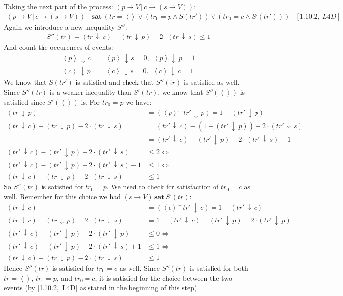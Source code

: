 \documentclass[11pt,a4paper]{article}
\def\ra{\rightarrow}
\def\ch{\,|\,}
\def\cat{^{\frown}}
\def\count{\,\downarrow\,}
\def\sat{\,\textbf{sat}\,}
\newcommand{\ab}[1]{\left \langle #1 \right \rangle}
\begin{document}
Taking the next part of the process: $(p \ra V \ch c \ra (s \ra V))$:
\begin{align*}
    (p \ra V \ch c \ra (s \ra V)) &\sat (
        tr = \ab{ } \lor
        (tr_0 = p \land S(tr')) \lor
        (tr_0 = c \land S'(tr'))
        ) & [1.10.2,~L4D]
\end{align*}
Again we introduce a new inequality $S''$:
\begin{align*}
    S''(tr) = (tr \count c) - (tr \count p) - 2 \cdot (tr \count s) \leq 1 
\end{align*}
And count the occurences of events:
\begin{align*}
        \ab{p} \count c &= \ab{p} \count s = 0,~~ \ab{p} \count p = 1 \\
        \ab{c} \count p &= \ab{c} \count s = 0,~~ \ab{c} \count c = 1
\end{align*}
We know that $S(tr')$ is satisfied and check that $S''(tr)$ is satisfied as
well. Since $S''(tr)$ is a weaker inequality than $S'(tr)$, we know that
$S''(\ab{ })$ is satisfied since $S'(\ab{ })$ is. For $tr_0 = p$ we have:
\begin{align*}
        (tr \count p) &= (\ab{p} \cat tr' \count p) = 1 + (tr' \count p) \\
    (tr \count c) - (tr \count p) - 2 \cdot (tr \count s) &=
        (tr' \count c) - (1+(tr' \count p)) - 2 \cdot (tr' \count s) \\
        &= (tr' \count c) - (tr' \count p) - 2 \cdot (tr' \count s) -1 \\
(tr' \count c) - (tr' \count p) - 2 \cdot (tr' \count s) &\leq 2 \Leftrightarrow
\\
        (tr' \count c) - (tr' \count p) - 2 \cdot (tr' \count s) -1 &\leq 1
        \Leftrightarrow \\
        (tr \count c) - (tr \count p) - 2 \cdot (tr \count s) &\leq 1
\end{align*}
So $S''(tr)$ is satisfied for $tr_0 = p$. We need to check for satisfaction of
$tr_0 = c$ as
well. Remember for this choice we had $(s \ra V) \sat S'(tr)$:
\begin{align*}
    (tr \count c) &= (\ab{c} \cat tr' \count c) = 1 + (tr' \count c) \\
    (tr \count c) - (tr \count p) - 2 \cdot (tr \count s) &=
        1 + (tr' \count c) - (tr' \count p) - 2 \cdot (tr' \count p) \\
    (tr' \count c) - (tr' \count p) - 2 \cdot (tr' \count p) &\leq 0
    \Leftrightarrow \\
    (tr' \count c) - (tr' \count p) - 2 \cdot (tr' \count s) +1 &\leq 1
    \Leftrightarrow \\
    (tr \count c) - (tr \count p) - 2 \cdot (tr \count s) &\leq 1
\end{align*}
Hence $S''(tr)$ is satisfied for $tr_0 = c$ as well. Since $S''(tr)$ is
satisfied for both $tr = \ab{ }$, $tr_0 = p$, and $tr_0 = c$, it is satisfied for the choice
between the two events (by [1.10.2,~L4D] as stated in the beginning of this
step).
\end{document}
